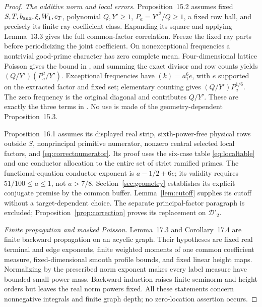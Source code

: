 \begin{proof}
\emph{The additive norm and local errors.}
Proposition~15.2 assumes fixed $S,T,b_{\rm aux},\xi,W_1,c_T$, polynomial $Q,Y'\ge1$, $P_a=Y'^2/Q\ge1$, a fixed row ball, and precisely its finite ray-coefficient class. Expanding its square and applying Lemma~13.3 gives the full common-factor correlation. Freeze the fixed ray parts before periodicizing the joint coefficient. On nonexceptional frequencies a nontrivial good-prime character has zero complete mean. Four-dimensional lattice Poisson gives the bound in , and summing the exact divisor and row counts yields $(Q/Y')(P_a^2/Y')$. Exceptional frequencies have $(k)=a_1^6e$, with $e$ supported on the extracted factor and fixed set; elementary counting gives $(Q/Y')P_a^{1/6}$. The zero frequency is the original diagonal and contributes $Q/Y'$. These are exactly the three terms in . No use is made of the geometry-dependent Proposition~15.3.

Proposition~16.1 assumes its displayed real strip, sixth-power-free physical rows outside $S$, nonprincipal primitive numerator, nonzero central selected local factors, and \eqref{eq:correctnumerator}. Its proof uses the six-case table \eqref{eq:localtable} and one conductor allocation to the entire set of strict ramified primes. The functional-equation conductor exponent is $a-1/2+6e$; its validity requires $51/100\le a\le1$, not $a>7/8$. Section~\ref{sec:geometry} establishes its explicit conjugate premise by the common buffer. Lemma~\ref{lem:cutoff} supplies its cutoff without a target-dependent choice. The separate principal-factor paragraph  is excluded; Proposition~\ref{prop:correction} proves its replacement on $\mathcal D'_2$.

\emph{Finite propagation and masked Poisson.}
Lemma~17.3 and Corollary~17.4 are finite backward propagation on an acyclic graph. Their hypotheses are fixed real terminal and edge exponents, finite weighted moments of one common coefficient measure, fixed-dimensional smooth profile bounds, and fixed linear height maps. Normalizing by the prescribed norm exponent makes every label measure have bounded small-power mass. Backward induction raises finite seminorm and height orders but leaves the real norm powers fixed. All these statements concern nonnegative integrals and finite graph depth; no zero-location assertion occurs.


\end{proof}
